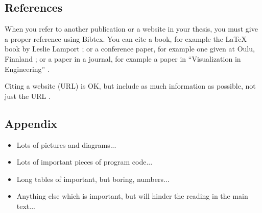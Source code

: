   \subsection{References}

	When you refer to another publication or a website in your thesis, you must give a proper reference using Bibtex. You can cite a book, for example the LaTeX book by Leslie Lamport \cite{lamport2005}; or a conference paper, for example one given at Oulu, Finnland \cite{hilfert_koenig_2015}; or a paper in a journal, for example a paper in ``Visualization in Engineering'' \cite{hilfert_koenig_2016}.

	Citing a website (URL) is OK, but include as much information as possible, not just the URL \cite{wiki:xxx}.

	\subsection{Appendix}

	\begin{itemize}
		\item
			Lots of pictures and diagrams...
		\item
			Lots of important pieces of program code...
		\item
			Long tables of important, but boring, numbers...
		\item
			Anything else which is important, but will hinder the reading in
			the main text...
	\end{itemize}
